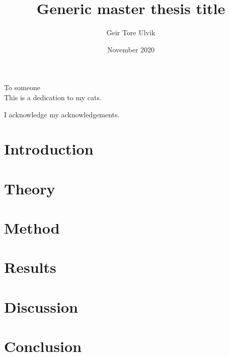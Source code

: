 \documentclass[twoside,english]{uiofysmaster}
\author{Geir Tore Ulvik}
\title{Generic master thesis title}
\date{November 2020}
\begin{document}
\maketitle

\begin{abstract}

\end{abstract}

\begin{dedication}
  To someone
  \\\vspace{12pt}
  This is a dedication to my cats.
\end{dedication}

\begin{acknowledgements}
  I acknowledge my acknowledgements.
\end{acknowledgements}

\tableofcontents

\chapter{Introduction}

\chapter{Theory}

\chapter{Method}

\chapter{Results}

\chapter{Discussion}

\chapter{Conclusion}




\end{document}
